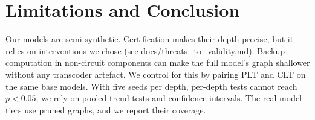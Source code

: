 \section{Limitations and Conclusion}
Our models are semi-synthetic. Certification makes their depth precise, but it relies on interventions we chose (see docs/threats\_to\_validity.md). Backup computation in non-circuit components can make the full model's graph shallower without any transcoder artefact. We control for this by pairing PLT and CLT on the same base models. With five seeds per depth, per-depth tests cannot reach $p<0.05$; we rely on pooled trend tests and confidence intervals. The real-model tiers use pruned graphs, and we report their coverage.
